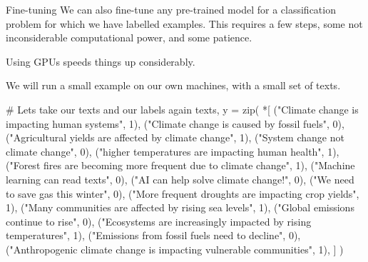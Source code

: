\documentclass[
  10pt,
  ignorenonframetext,
  aspectratio=169]{beamer}
\newenvironment{Shaded}{\begin{snugshade}}{\end{snugshade}}
\newcommand{\BuiltInTok}[1]{\textcolor[rgb]{0.80,0.80,0.80}{#1}}
\newcommand{\CommentTok}[1]{\textcolor[rgb]{0.50,0.62,0.50}{#1}}
\newcommand{\DecValTok}[1]{\textcolor[rgb]{0.86,0.86,0.80}{#1}}
\newcommand{\NormalTok}[1]{\textcolor[rgb]{0.80,0.80,0.80}{#1}}
\newcommand{\OperatorTok}[1]{\textcolor[rgb]{0.94,0.94,0.82}{#1}}
\newcommand{\StringTok}[1]{\textcolor[rgb]{0.80,0.58,0.58}{#1}}
\begin{document}
\begin{frame}[fragile]{Fine-tuning}
\protect\hypertarget{fine-tuning}{}
We can also fine-tune any pre-trained model for a classification problem
for which we have labelled examples. This requires a few steps, some not
inconsiderable computational power, and some patience.

Using GPUs speeds things up considerably.

We will run a small example on our own machines, with a small set of
texts.

\medskip

\scriptsize

\begin{Shaded}
\begin{Highlighting}[]
\CommentTok{\# Let\textquotesingle{}s take our texts and our labels again}
\NormalTok{texts, y }\OperatorTok{=} \BuiltInTok{zip}\NormalTok{(}
    \OperatorTok{*}\NormalTok{[}
\NormalTok{        (}\StringTok{"Climate change is impacting human systems"}\NormalTok{, }\DecValTok{1}\NormalTok{),}
\NormalTok{        (}\StringTok{"Climate change is caused by fossil fuels"}\NormalTok{, }\DecValTok{0}\NormalTok{),}
\NormalTok{        (}\StringTok{"Agricultural yields are affected by climate change"}\NormalTok{, }\DecValTok{1}\NormalTok{),}
\NormalTok{        (}\StringTok{"System change not climate change"}\NormalTok{, }\DecValTok{0}\NormalTok{),}
\NormalTok{        (}\StringTok{"higher temperatures are impacting human health"}\NormalTok{, }\DecValTok{1}\NormalTok{),}
\NormalTok{        (}\StringTok{"Forest fires are becoming more frequent due to climate change"}\NormalTok{, }\DecValTok{1}\NormalTok{),}
\NormalTok{        (}\StringTok{"Machine learning can read texts"}\NormalTok{, }\DecValTok{0}\NormalTok{),}
\NormalTok{        (}\StringTok{"AI can help solve climate change!"}\NormalTok{, }\DecValTok{0}\NormalTok{),}
\NormalTok{        (}\StringTok{"We need to save gas this winter"}\NormalTok{, }\DecValTok{0}\NormalTok{),}
\NormalTok{        (}\StringTok{"More frequent droughts are impacting crop yields"}\NormalTok{, }\DecValTok{1}\NormalTok{),}
\NormalTok{        (}\StringTok{"Many communities are affected by rising sea levels"}\NormalTok{, }\DecValTok{1}\NormalTok{),}
\NormalTok{        (}\StringTok{"Global emissions continue to rise"}\NormalTok{, }\DecValTok{0}\NormalTok{),}
\NormalTok{        (}\StringTok{"Ecosystems are increasingly impacted by rising temperatures"}\NormalTok{, }\DecValTok{1}\NormalTok{),}
\NormalTok{        (}\StringTok{"Emissions from fossil fuels need to decline"}\NormalTok{, }\DecValTok{0}\NormalTok{),}
\NormalTok{        (}\StringTok{"Anthropogenic climate change is impacting vulnerable communities"}\NormalTok{, }\DecValTok{1}\NormalTok{),}
\NormalTok{    ]}
\NormalTok{)}
\end{Highlighting}
\end{Shaded}
\end{frame}
\end{document}
